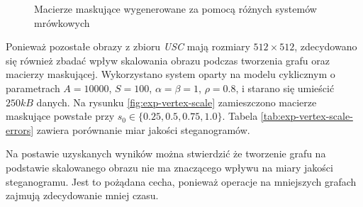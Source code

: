 {{{\begin{figure}
                \caption[Porównania wizualizacji konwersji oraz macierzy maskujących.]
                {Macierze maskujące wygenerowane za pomocą różnych systemów mrówkowych}
                \label{fig:exp-vertex-masks}
            \end{figure}

            Ponieważ pozostałe obrazy z zbioru \textit{USC} mają rozmiary $512 \times 512$, zdecydowano się również
            zbadać wpływ skalowania obrazu podczas tworzenia grafu oraz macierzy maskującej. Wykorzystano system oparty
            na modelu cyklicznym o parametrach $A=10000$, $S=100$, $\alpha=\beta=1$, $\rho=0.8$, i starano się umieścić
            $250kB$ danych. Na rysunku \ref{fig:exp-vertex-scale} zamieszczono macierze maskujące powstałe przy $s_0 \in
            \{0.25, 0.5, 0.75, 1.0\}$. Tabela \ref{tab:exp-vertex-scale-errors} zawiera porównanie miar jakości
            steganogramów.

            Na postawie uzyskanych wyników można stwierdzić że tworzenie grafu na podstawie skalowanego obrazu nie ma
            znaczącego wpływu na miary jakości steganogramu. Jest to pożądana cecha, ponieważ operacje na mniejszych
            grafach zajmują zdecydowanie mniej czasu.

}}}
